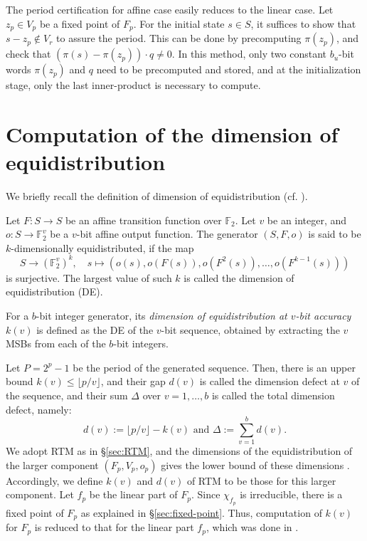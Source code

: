 \documentclass{svmult}
\begin{document}
The period certification for affine case easily reduces to the linear case. 
Let $z_p \in V_p$ be a fixed point of $F_p$. For the initial state $s \in S$,
it suffices to show that $s-z_p \notin V_r$ to assure the period. This 
can be done by precomputing $\pi(z_p)$, and check that 
$(\pi(s)-\pi(z_p))\cdot q \neq 0$. In this method, only two
constant $b_u$-bit words $\pi(z_p)$ and $q$ need to be precomputed
and stored, and at the initialization stage, only the last inner-product
is necessary to compute.

\section{Computation of the dimension of equidistribution}
\label{sec:DE}
We briefly recall the definition of dimension of 
equidistribution (cf. \cite{CLT}\cite{COMBTAUS}\cite{SFMT}).
\begin{definition}\label{def:DE}
Let $F:S \to S$ be an affine transition function over $\mathbb{F}_2$.
Let $v$ be an integer, and $o:S \to {\mathbb F}_2^v$ be a $v$-bit
affine output function. The generator $(S, F, o)$ is said to be 
$k$-dimensionally equidistributed, if the map
$$
 S \to ({\mathbb F}_2^v)^k, \quad s \mapsto (o(s),o(F(s)), o(F^2(s)),\ldots,o(F^{k-1}(s)))
$$
is surjective.
The largest value of such $k$ is called the dimension 
of equidistribution (DE).
\end{definition}
For a $b$-bit integer generator, its {\em dimension of 
equidistribution at $v$-bit accuracy} $k(v)$
is defined as the DE of the $v$-bit sequence, obtained by extracting
the $v$ MSBs from each of the $b$-bit integers.

Let $P=2^p-1$ be the period of the generated sequence.
Then, there is an upper bound
$k(v) \leq \lfloor p / v \rfloor$,
and their gap $d(v)$ is 
called the dimension defect at $v$ of the sequence,
and their sum $\Delta$ over $v=1,\ldots,b$ is called
the total dimension defect, namely: 
\begin{equation}\label{eq:total-dim-difect}
d(v):=\lfloor p / v \rfloor -k(v) 
\mbox{ and } \Delta:=\sum_{v=1}^b d(v).
\end{equation}
We adopt RTM as in \S\ref{sec:RTM}, and 
the dimensions of the equidistribution of 
the larger component $(F_p, V_p, o_p)$ gives the 
lower bound of these dimensions \cite{LEcuyer-combdif}
\cite{SFMT}. Accordingly, we define $k(v)$ and $d(v)$ of
RTM to be those for this larger component. Let $f_p$
be the linear part of $F_p$.
Since $\chi_{f_p}$ is irreducible, there is a fixed point
of $F_p$ as explained in \S\ref{sec:fixed-point}. Thus,
computation of $k(v)$ for $F_p$ is reduced to 
that for the linear part $f_p$, which was done in \cite{SFMT}.
\end{document}
